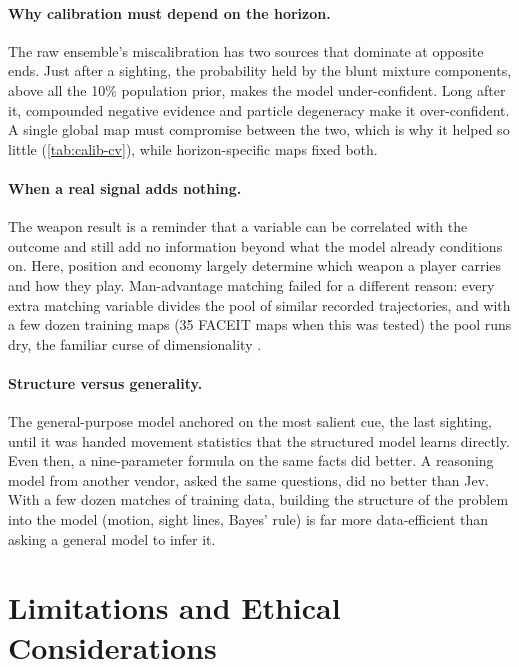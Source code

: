 \documentclass[11pt]{article}
\newcommand{\1}{\mathbb{1}}
\begin{document}
\paragraph{Why calibration must depend on the horizon.} The raw ensemble's miscalibration has two sources that dominate at opposite ends. Just after a sighting, the probability held by the blunt mixture components, above all the 10\% population prior, makes the model under-confident. Long after it, compounded negative evidence and particle degeneracy make it over-confident. A single global map must compromise between the two, which is why it helped so little (\cref{tab:calib-cv}), while horizon-specific maps fixed both.

\paragraph{When a real signal adds nothing.} The weapon result is a reminder that a variable can be correlated with the outcome and still add no information beyond what the model already conditions on. Here, position and economy largely determine which weapon a player carries and how they play. Man-advantage matching failed for a different reason: every extra matching variable divides the pool of similar recorded trajectories, and with a few dozen training maps (35 FACEIT maps when this was tested) the pool runs dry, the familiar curse of dimensionality \citep{bellman1961adaptive}.

\paragraph{Structure versus generality.} The general-purpose model anchored on the most salient cue, the last sighting, until it was handed movement statistics that the structured model learns directly. Even then, a nine-parameter formula on the same facts did better. A reasoning model from another vendor, asked the same questions, did no better than Jev. With a few dozen matches of training data, building the structure of the problem into the model (motion, sight lines, Bayes' rule) is far more data-efficient than asking a general model to infer it.

\section{Limitations and Ethical Considerations}
\label{sec:limitations}
\end{document}
